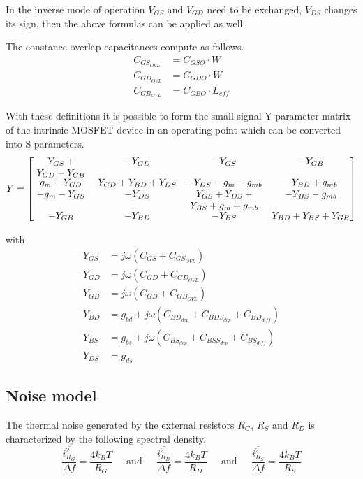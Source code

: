 \documentclass[10pt]{report}
\begin{document}
In the inverse mode of operation $V_{GS}$ and $V_{GD}$ need to be
exchanged, $V_{DS}$ changes its sign, then the above formulas can be
applied as well.

\addvspace{12pt}

The constance overlap capacitances compute as follows.
\begin{align}
C_{GS_{OVL}} &= C_{GSO}\cdot W\\
C_{GD_{OVL}} &= C_{GDO}\cdot W\\
C_{GB_{OVL}} &= C_{GBO}\cdot L_{eff}
\end{align}

With these definitions it is possible to form the small signal
Y-parameter matrix of the intrinsic MOSFET device in an operating
point which can be converted into S-parameters.
\begin{equation}
Y =
\begin{bmatrix}
\parbox[t]{2.0cm}{\centering $Y_{GS} + Y_{GD} + Y_{GB}$} & -Y_{GD} & -Y_{GS} & -Y_{GB}\\
g_{m} - Y_{GD} & Y_{GD} + Y_{BD} + Y_{DS} & -Y_{DS} - g_{m} - g_{mb} & -Y_{BD} + g_{mb}\\
-g_{m} - Y_{GS} & -Y_{DS} & \parbox[t]{2.5cm}{\centering $Y_{GS} + Y_{DS} + Y_{BS} + g_{m} + g_{mb}$} & -Y_{BS} - g_{mb}\\
-Y_{GB} & -Y_{BD} & -Y_{BS} & Y_{BD} + Y_{BS} + Y_{GB}\\
\end{bmatrix}
\end{equation}

with
\begin{align}
Y_{GS} &= j\omega \left(C_{GS} + C_{GS_{OVL}}\right)\\
Y_{GD} &= j\omega \left(C_{GD} + C_{GD_{OVL}}\right)\\
Y_{GB} &= j\omega \left(C_{GB} + C_{GB_{OVL}}\right)\\
Y_{BD} &= g_{bd} + j\omega \left(C_{BD_{dep}} + C_{BDS_{dep}} + C_{BD_{diff}}\right)\\
Y_{BS} &= g_{bs} + j\omega \left(C_{BS_{dep}} + C_{BSS_{dep}} + C_{BS_{diff}}\right)\\
Y_{DS} &= g_{ds}
\end{align}

\subsection{Noise model}

The thermal noise generated by the external resistors $R_G$, $R_S$ and
$R_D$ is characterized by the following spectral density.
\begin{equation}
\dfrac{\overline{i_{R_G}^2}}{\Delta f} = \dfrac{4 k_B T}{R_G}
\;\;\;\; \textrm{ and } \;\;\;\;
\dfrac{\overline{i_{R_D}^2}}{\Delta f} = \dfrac{4 k_B T}{R_D}
\;\;\;\; \textrm{ and } \;\;\;\;
\dfrac{\overline{i_{R_S}^2}}{\Delta f} = \dfrac{4 k_B T}{R_S}
\end{equation}
\end{document}
